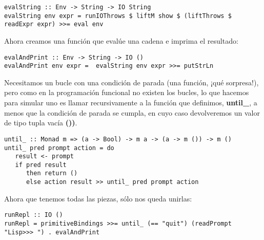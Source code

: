 \begin{minipage}{\linewidth}
\begin{tiny}
\begin{lstlisting}[frame=single]
evalString :: Env -> String -> IO String
evalString env expr = runIOThrows $ liftM show $ (liftThrows $ readExpr expr) >>= eval env
\end{lstlisting}
\end{tiny}
\end{minipage}

Ahora creamos una funci\'on que eval\'ue una cadena e imprima el resultado:\\

\begin{minipage}{\linewidth}
\begin{footnotesize}
\begin{lstlisting}[frame=single]
evalAndPrint :: Env -> String -> IO ()
evalAndPrint env expr =  evalString env expr >>= putStrLn
\end{lstlisting}
\end{footnotesize}
\end{minipage}

Necesitamos un bucle con una condici\'on de parada (una funci\'on, \mbox{¡}qu\'e sorpresa!), pero como en la programaci\'on funcional no existen los bucles, lo que hacemos para simular uno es llamar recursivamente a la funci\'on que definimos, \textbf{until\_}, a menos que la condici\'on de parada se cumpla, en cuyo caso devolveremos un valor de tipo tupla vac\'ia \textbf{())}.\\

\begin{minipage}{\linewidth}
\begin{footnotesize}
\begin{lstlisting}[frame=single]
until_ :: Monad m => (a -> Bool) -> m a -> (a -> m ()) -> m ()
until_ pred prompt action = do 
   result <- prompt
   if pred result 
      then return ()
      else action result >> until_ pred prompt action
\end{lstlisting}
\end{footnotesize}
\end{minipage}

Ahora que tenemos todas las piezas, s\'olo nos queda unirlas:\\

\begin{minipage}{\linewidth}
\begin{tiny}
\begin{lstlisting}[frame=single]
runRepl :: IO ()
runRepl = primitiveBindings >>= until_ (== "quit") (readPrompt "Lisp>>> ") . evalAndPrint
\end{lstlisting}
\end{tiny}
\end{minipage}

